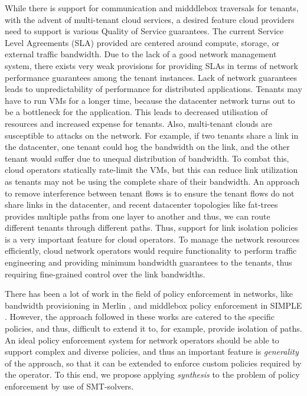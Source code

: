 \documentclass[]{sig}
\begin{document}
While there is support for communication and midddlebox traversals for tenants, with the advent of multi-tenant cloud services, a desired feature cloud providers need to support is various Quality of Service guarantees. The current Service Level Agreements (SLA) provided are centered around compute, storage, or external traffic bandwidth. Due to the lack of a good network management system, there exists very weak provisions for providing SLAs in terms of network performance guarantees among the tenant instances. Lack of network guarantees leads to unpredictability of performance for distributed applications. Tenants may have to run VMs for a longer time, because the datacenter network turns out to be a bottleneck for the application. This leads to decreased utilisation of resources and increased expense for tenants. Also, multi-tenant clouds are susceptible to attacks on the network. For example, if two tenants share a link in the datacenter, one tenant could hog the bandwidth on the link, and the other tenant would suffer due to unequal distribution of bandwidth. To combat this, cloud operators statically rate-limit the VMs, but this can reduce link utilization as tenants may not be using the complete share of their bandwidth. An approach to remove interference between tenant flows is to ensure the tenant flows do not share links in the datacenter, and recent datacenter topologies like fat-trees provides multiple paths from one layer to another and thus, we can route different tenants through different paths. Thus, support for link isolation policies is a very important feature for cloud operators. To manage the network resources efficiently, cloud network operators would require functionality to perform traffic engineering and providing minimum bandwidth guarantees to the tenants, thus requiring fine-grained control over the link bandwidths. 

There has been a lot of work in the field of policy enforcement in networks, like bandwidth provisioning in Merlin \cite{Merlin}, and middlebox policy enforcement in SIMPLE \cite{simple}. However, the approach followed in these works are catered to the specific policies, and thus, difficult to extend it to, for example, provide isolation of paths. An ideal policy enforcement system for network operators should be able to support complex and diverse policies, and thus an important feature is \emph{generality} of the approach, so that it can be extended to enforce custom policies required by the operator. To this end, we propose applying \emph{synthesis} to the problem of policy enforcement by use of SMT-solvers.
\end{document}
